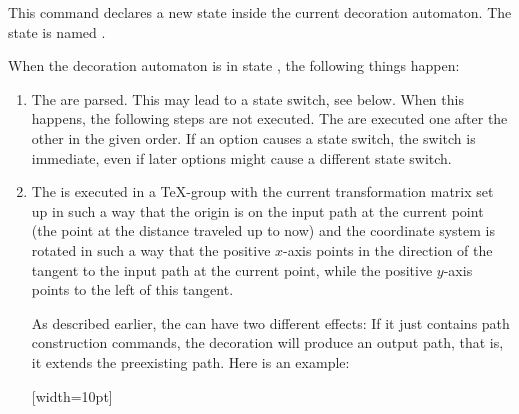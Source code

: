 \begin{command}{\pgfdeclaredecoration{}}
    \begin{command}{\state{}}
        This command declares a new state inside the current decoration
        automaton. The state is named .

        When the decoration automaton is in state , the following
        things happen:
        \begin{enumerate}
            \item The  are parsed. This may lead to a state
                switch, see below. When this happens, the following steps are
                not executed. The  are executed one after the
                other in the given order. If an option causes a state switch,
                the switch is immediate, even if later options might cause a
                different state switch.
            \item The  is executed in a \TeX-group with the current
                transformation matrix set up in such a way that the origin is
                on the input path at the current point (the point at the
                distance traveled up to now) and the coordinate system is
                rotated in such a way that the positive $x$-axis points in the
                direction of the tangent to the input path at the current
                point, while the positive $y$-axis points to the left of this
                tangent.

                As described earlier, the  can have two different
                effects: If it just contains path construction commands, the
                decoration will produce an output path, that is, it extends the
                preexisting path. Here is an example:
\begin{codeexample}[preamble={\usetikzlibrary{decorations}}]
{
  [width=10pt]
  {
    \pgfpathlineto{\pgfpoint{0pt}{5pt}}
    \pgfpathlineto{\pgfpoint{5pt}{5pt}}
    \pgfpathlineto{\pgfpoint{5pt}{-5pt}}
    \pgfpathlineto{\pgfpoint{10pt}{-5pt}}
    \pgfpathlineto{\pgfpoint{10pt}{0pt}}
  }
  {
    \pgfpathlineto{\pgfpointdecoratedpathlast}
  }
}
\end{codeexample}


\end{enumerate}
\end{command}
\end{command}
